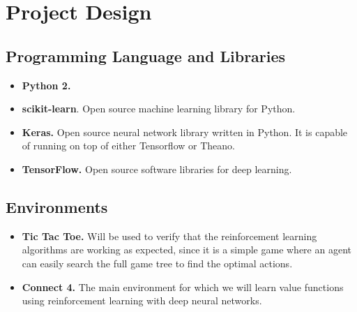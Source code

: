 \documentclass{article}
\begin{document}
\section{Project Design}

\subsection{Programming Language and Libraries}

\begin{itemize}

    \item \textbf{Python 2.}

    \item \textbf{scikit-learn}. Open source machine learning library for Python.

    \item \textbf{Keras.} Open source neural network library written in Python. It is capable of
        running on top of either Tensorflow or Theano.

    \item \textbf{TensorFlow.} Open source software libraries for deep learning.

\end{itemize}

\subsection{Environments}

\begin{itemize}

    \item \textbf{Tic Tac Toe.} Will be used to verify that the reinforcement learning algorithms
        are working as expected, since it is a simple game where an agent can easily search the full
        game tree to find the optimal actions.

    \item \textbf{Connect 4.} The main environment for which we will learn value functions using
        reinforcement learning with deep neural networks.

\end{itemize}
\end{document}

